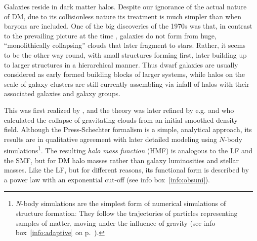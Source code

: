 \documentclass[useAMS]{aa}
\begin{document}
Galaxies reside in dark matter halos.
Despite our ignorance of the actual nature of DM, due to its collisionless nature its treatment is much simpler than when baryons are included.
One of the big discoveries of the 1970s was that, in contrast to the prevailing picture at the time \citep{Eggen1962}, galaxies do not form from huge, ``monolithically collapsing'' clouds that later fragment to stars.
Rather, it seems to be the other way round, with small structures forming first, later building up to larger structures in a hierarchical manner.
Thus dwarf galaxies are usually considered as early formed building blocks of larger systems, while halos on the scale of galaxy clusters are still currently assembling via infall of halos with their associated galaxies and galaxy groups.

This was first realized by \citet{Press1974}, and the theory was later refined by e.g. \citet{Sheth2002} and \citet{Tinker2008} who calculated the collapse of gravitating clouds from an initial smoothed density field.
Although the Press-Schechter formalism is a simple, analytical approach, its results are in qualitative agreement with later detailed modeling using $N$-body simulations\footnote{$N$-body simulations are the simplest form of numerical simulations of structure formation: They follow the trajectories of particles representing samples of matter, moving under the influence of gravity (see info box~\ref{info:adaptive} on p.~\pageref{info:adaptive}).}.
The resulting \emph{halo mass function} (HMF) is analogous to the LF and the SMF, but for DM halo masses rather than galaxy luminosities and stellar masses.
Like the LF, but for different reasons, its functional form is described by a power law with an exponential cut-off (see info box~\ref{info:obsuni}).
\end{document}
